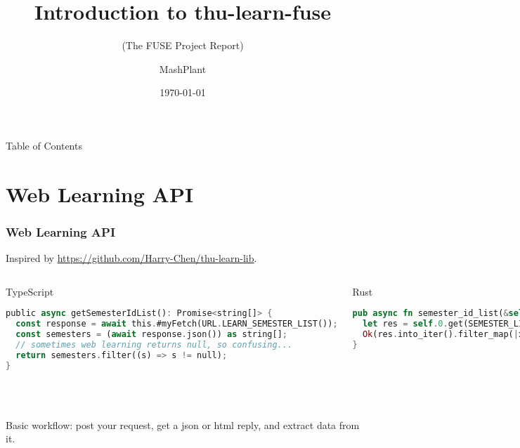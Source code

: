 \documentclass[usenames,xcolor=svgnames,11pt,sans]{beamer}
\begin{document}
  
\title{Introduction to thu-learn-fuse}
\subtitle{(The FUSE Project Report)}
\author{MashPlant}
\date{\today}
  


\begin{frame}
\titlepage
\end{frame}

\begin{frame}{Table of Contents}
\tableofcontents
\end{frame}

\section{Web Learning API}

\begin{frame}[fragile]
\frametitle{Web Learning API}
Inspired by 
\href{https://github.com/Harry-Chen/thu-learn-lib}{https://github.com/Harry-Chen/thu-learn-lib}.

\pause

\begin{columns}
  \begin{block}{TypeScript}
    \begin{lstlisting}[language=Rust, morekeywords = {public,string,null}, basicstyle = \fontsize{5}{5}\ttfamily\color{BlackText}]
public async getSemesterIdList(): Promise<string[]> {
  const response = await this.#myFetch(URL.LEARN_SEMESTER_LIST());
  const semesters = (await response.json()) as string[];
  // sometimes web learning returns null, so confusing...
  return semesters.filter((s) => s != null);
}
    \end{lstlisting}
  \end{block}
  \begin{block}{Rust}
    ~\\
    \begin{lstlisting}[language=Rust, basicstyle = \fontsize{5}{5}\ttfamily\color{BlackText}]
pub async fn semester_id_list(&self) -> Result<Vec<Id>> {
  let res = self.0.get(SEMESTER_LIST).send().await?.json::<Vec<Option<String>>>().await?;
  Ok(res.into_iter().filter_map(|x| x).collect())
}
    \end{lstlisting}
  \end{block}
\end{columns}

\pause

~\\~\\

Basic workflow: post your request, get a json or html reply, and extract data from it.
\end{frame}
\end{document}
